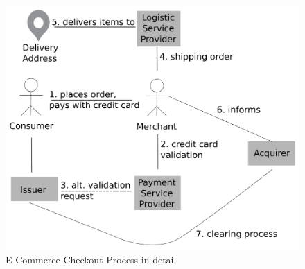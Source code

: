 \begin{figure}[H]
	\centering
		\includegraphics[width=0.8\columnwidth]{images/e-commerce-checkout-process.pdf}
	\caption{E-Commerce Checkout Process in detail}
\label{fig:images_ecommerce_checkout_process}
\end{figure}

